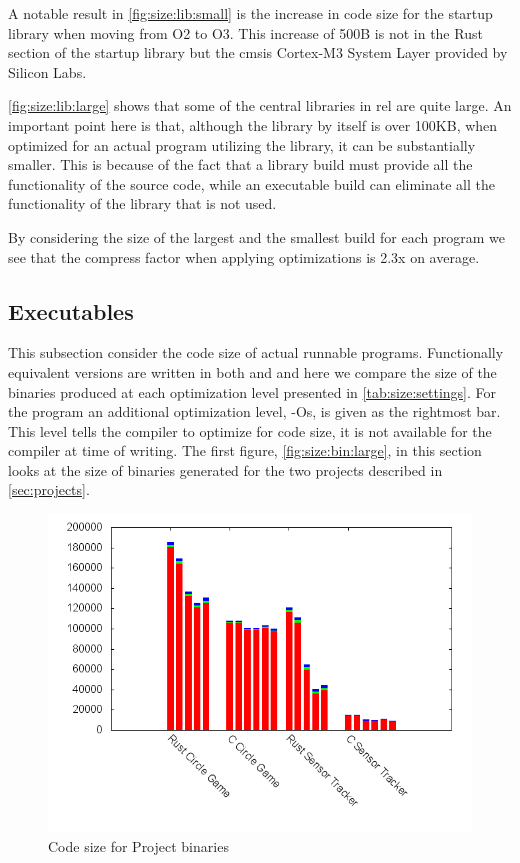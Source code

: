A notable result in \autoref{fig:size:lib:small} is the increase in code size for the startup library when moving from O2 to O3.
This increase of 500B is not in the Rust section of the startup library but the \gls{cmsis} Cortex-M3 System Layer provided by Silicon Labs.

\autoref{fig:size:lib:large} shows that some of the central libraries in \gls{rel} are quite large.
An important point here is that, although the  library by itself is over 100KB, when optimized for an actual program utilizing the library, it can be substantially smaller.
This is because of the fact that a library build must provide all the functionality of the source code, while an executable build can eliminate all the functionality of the library that is not used.

By considering the size of the largest and the smallest build for each program we see that the compress factor when applying optimizations is 2.3x on average.

\subsection{Executables}

This subsection consider the code size of actual runnable programs.
Functionally equivalent versions are written in both {\rust} and {\C} and here we compare the size of the binaries produced at each optimization level presented in \autoref{tab:size:settings}.
For the {\C} program an additional optimization level, -Os, is given as the rightmost bar.
This level tells the compiler to optimize for code size, it is not available for the {\rust} compiler at time of writing.
The first figure, \autoref{fig:size:bin:large}, in this section looks at the size of binaries generated for the two projects described in \autoref{sec:projects}.

\begin{figure}[H]
  \begin{center}
    \includegraphics[scale=0.5]{results/plots/size/bin/large/size.png}
  \end{center}
  \caption{Code size for Project binaries}
  \label{fig:size:bin:large}
\end{figure}

